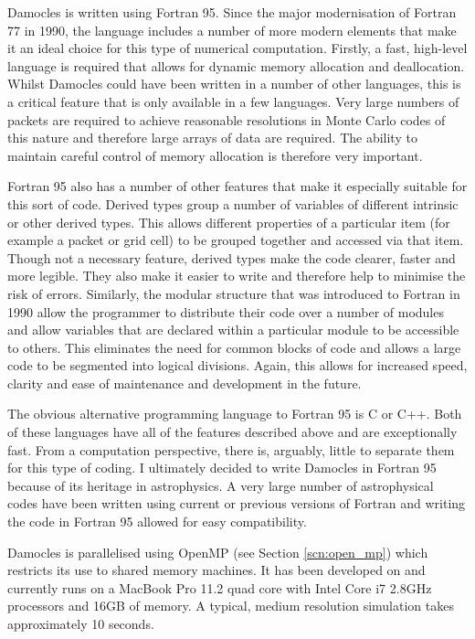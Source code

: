 	Damocles is written using Fortran 95.  Since the major modernisation of Fortran 77 in 1990, the language includes a number of more modern elements that make it an ideal choice for this type of numerical computation.  Firstly, a fast, high-level language is required that allows for dynamic memory allocation and deallocation.  Whilst Damocles could have been written in a number of other languages, this is a critical feature that is only available in a few languages.  Very large numbers of packets are required to achieve reasonable resolutions in Monte Carlo codes of this nature and therefore  large arrays of data are required.  The ability to maintain careful control of memory allocation is therefore very important.  
	
	Fortran 95 also has a number of other features that make it especially suitable for this sort of code.  Derived types group a number of variables of different intrinsic or other derived types.  This allows different properties of a particular item (for example a packet or grid cell) to be grouped together and accessed via that item. Though not a necessary feature, derived types make the code clearer, faster and more legible.  They also make it easier to write and therefore help to minimise the risk of errors.  Similarly, the modular structure that was introduced to Fortran in 1990 allow the programmer to distribute their code over a number of modules and allow variables that are declared within a particular module to be accessible to others.  This eliminates the need for common blocks of code  and allows a large code to be segmented into logical divisions.  Again, this allows for increased speed, clarity and ease of maintenance and development in the future.
	
	The obvious alternative programming language to Fortran 95 is C or C++.  Both of these languages have all of the features described above and are exceptionally fast.  From a computation perspective, there is, arguably, little to separate them for this type of coding.  I ultimately decided to write Damocles in Fortran 95 because of its heritage in astrophysics.  A very large number of astrophysical codes have been written using current or previous versions of Fortran and writing the code in Fortran 95 allowed for easy compatibility.
	
	Damocles is parallelised using OpenMP (see Section \ref{scn:open_mp}) which restricts its use to shared memory machines.  It has been developed on and currently runs on a MacBook Pro 11.2 quad core with Intel Core i7 2.8GHz processors and 16GB of memory.  A typical, medium resolution simulation takes approximately 10 seconds.
	


